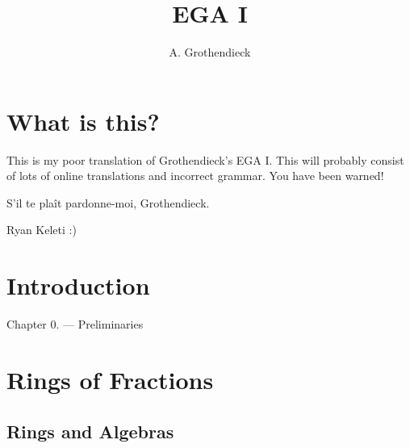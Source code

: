 \documentclass[10pt]{amsart}
\title{EGA I}
\author{A. Grothendieck}
\date{ }
\theoremstyle{plain}
\theoremstyle{definition}
\begin{document}
\maketitle
\tableofcontents{}

\section*{What is this?}

This is my poor translation of Grothendieck's EGA I. This
will probably consist of lots of online translations and incorrect grammar.
You have been warned!

S'il te pla\^it pardonne-moi, Grothendieck.

Ryan Keleti :)

\section*{Introduction}


Chapter 0. --- Preliminaries
\section*{Rings of Fractions}
\subsection*{Rings and Algebras}\mbox{}\\

\end{document}
